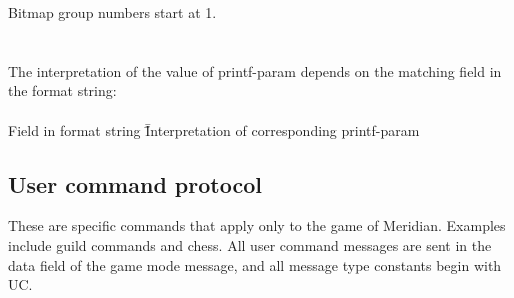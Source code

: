 \begin{protocol}
Bitmap group numbers start at 1. \\
\\
\\
The interpretation of the value of printf-param depends on the matching field in the format string: \\
\\
\pushtabs
Field in format string 	\hspace{0.2in}\=\=Interpretation of corresponding printf-param \\
\poptabs

\end{protocol}

\subsection{User command protocol}
\label{sec:usercmd}

These are specific commands that apply only to the game of Meridian.
Examples include guild commands and chess.  All user command messages
are sent in the data field of the  game mode
message, and all message type constants begin with UC.

